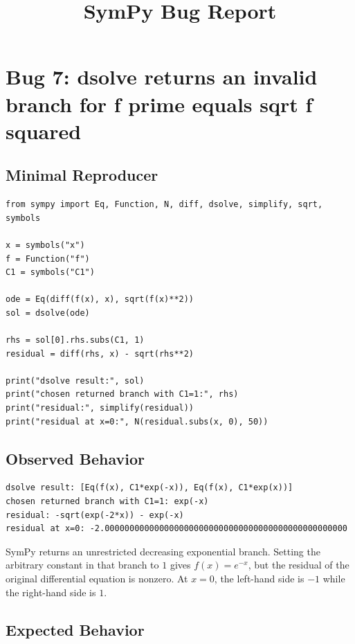 \documentclass[11pt]{article}
\title{SymPy Bug Report}
\author{}
\date{}
\begin{document}
\maketitle

\section{Bug 7: dsolve returns an invalid branch for f prime equals sqrt f squared}

\subsection{Minimal Reproducer}

\medskip

\begin{lstlisting}[style=bugpython]
from sympy import Eq, Function, N, diff, dsolve, simplify, sqrt, symbols

x = symbols("x")
f = Function("f")
C1 = symbols("C1")

ode = Eq(diff(f(x), x), sqrt(f(x)**2))
sol = dsolve(ode)

rhs = sol[0].rhs.subs(C1, 1)
residual = diff(rhs, x) - sqrt(rhs**2)

print("dsolve result:", sol)
print("chosen returned branch with C1=1:", rhs)
print("residual:", simplify(residual))
print("residual at x=0:", N(residual.subs(x, 0), 50))
\end{lstlisting}

\subsection{Observed Behavior}

\medskip

\begin{lstlisting}[style=bugpython]
dsolve result: [Eq(f(x), C1*exp(-x)), Eq(f(x), C1*exp(x))]
chosen returned branch with C1=1: exp(-x)
residual: -sqrt(exp(-2*x)) - exp(-x)
residual at x=0: -2.0000000000000000000000000000000000000000000000000
\end{lstlisting}

SymPy returns an unrestricted decreasing exponential branch.  Setting the
arbitrary constant in that branch to \(1\) gives \(f(x)=e^{-x}\), but the
residual of the original differential equation is nonzero.  At \(x=0\), the
left-hand side is \(-1\) while the right-hand side is \(1\).

\subsection{Expected Behavior}
\end{document}
